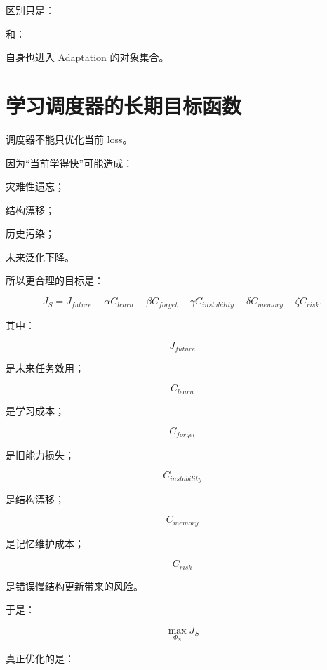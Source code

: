 区别只是：

\begin{statementbox}
\centering
{}
\end{statementbox}

和：

\begin{statementbox}
\centering
{}
\end{statementbox}

自身也进入 Adaptation 的对象集合。


\section{学习调度器的长期目标函数}

调度器不能只优化当前 loss。

因为“当前学得快”可能造成：

灾难性遗忘；

结构漂移；

历史污染；

未来泛化下降。

所以更合理的目标是：

\[
\boxed{
J_S
=
J_{future}
-
\alpha C_{learn}
-
\beta C_{forget}
-
\gamma C_{instability}
-
\delta C_{memory}
-
\zeta C_{risk}.
}
\]

其中：

\[
J_{future}
\]

是未来任务效用；

\[
C_{learn}
\]

是学习成本；

\[
C_{forget}
\]

是旧能力损失；

\[
C_{instability}
\]

是结构漂移；

\[
C_{memory}
\]

是记忆维护成本；

\[
C_{risk}
\]

是错误慢结构更新带来的风险。

于是：

\[
\boxed{
\max_{\Phi_S}J_S
}
\]

真正优化的是：

\begin{statementbox}
\centering
{}
\end{statementbox}

